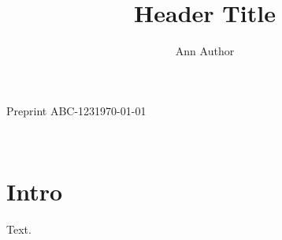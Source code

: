 \documentclass{article}
\title{Header Title}\author{Ann Author}
\begin{document}
\noindent Preprint ABC-123\hfill\today\par
\vspace{1cm}
\begin{center}{\Large\@title}\\[1em]\@author\end{center}
\section{Intro}
Text.
\end{document}
